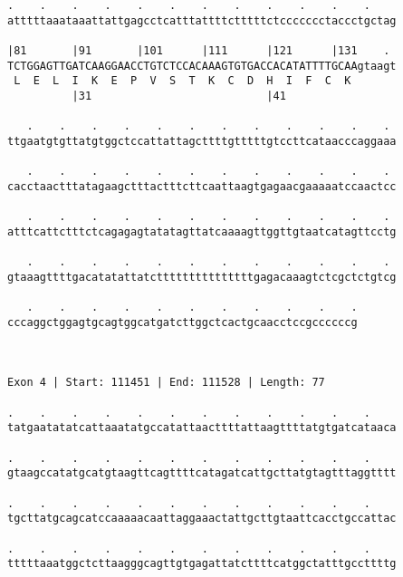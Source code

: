 \documentclass{article}
\begin{document}
\begin{Verbatim}
.    .    .    .    .    .    .    .    .    .    .    .    
atttttaaataaattattgagcctcatttattttctttttctccccccctaccctgctag
                                                            
|81       |91       |101      |111      |121      |131    . 
TCTGGAGTTGATCAAGGAACCTGTCTCCACAAAGTGTGACCACATATTTTGCAAgtaagt
 L  E  L  I  K  E  P  V  S  T  K  C  D  H  I  F  C  K       
          |31                           |41                 
  
   .    .    .    .    .    .    .    .    .    .    .    . 
ttgaatgtgttatgtggctccattattagcttttgtttttgtccttcataacccaggaaa
                                                            
   .    .    .    .    .    .    .    .    .    .    .    . 
cacctaactttatagaagctttactttcttcaattaagtgagaacgaaaaatccaactcc
                                                            
   .    .    .    .    .    .    .    .    .    .    .    . 
atttcattctttctcagagagtatatagttatcaaaagttggttgtaatcatagttcctg
                                                            
   .    .    .    .    .    .    .    .    .    .    .    . 
gtaaagttttgacatatattatctttttttttttttttgagacaaagtctcgctctgtcg
                                                            
   .    .    .    .    .    .    .    .    .    .    .
cccaggctggagtgcagtggcatgatcttggctcactgcaacctccgccccccg
                                                      
                                                      
 
Exon 4 | Start: 111451 | End: 111528 | Length: 77
 
.    .    .    .    .    .    .    .    .    .    .    .    
tatgaatatatcattaaatatgccatattaacttttattaagttttatgtgatcataaca
                                                            
.    .    .    .    .    .    .    .    .    .    .    .    
gtaagccatatgcatgtaagttcagttttcatagatcattgcttatgtagtttaggtttt
                                                            
.    .    .    .    .    .    .    .    .    .    .    .    
tgcttatgcagcatccaaaaacaattaggaaactattgcttgtaattcacctgccattac
                                                            
.    .    .    .    .    .    .    .    .    .    .    .    
tttttaaatggctcttaagggcagttgtgagattatcttttcatggctatttgccttttg
                                                            

\end{Verbatim}
\end{document}
